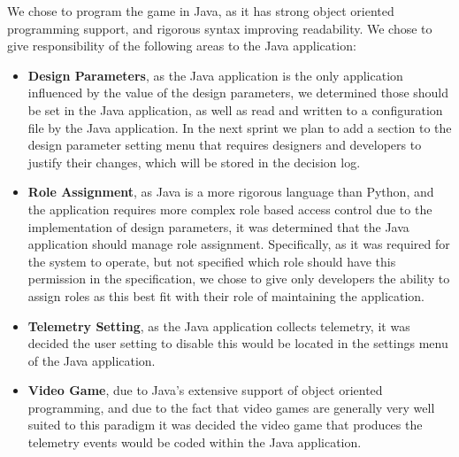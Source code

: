 We chose to program the game in Java, as it has strong object oriented programming support, and rigorous syntax improving readability. We chose to give responsibility of the following areas to the Java application:
\begin{itemize}
  \item \textbf{Design Parameters}, as the Java application is the only application influenced by the value of the design parameters, we determined those should be set in the Java application, as well as read and written to a configuration file by the Java application. In the next sprint we plan to add a section to the design parameter setting menu that requires designers and developers to justify their changes, which will be stored in the decision log.
  \item \textbf{Role Assignment}, as Java is a more rigorous language than Python, and the application requires more complex role based access control due to the implementation of design parameters, it was determined that the Java application should manage role assignment. Specifically, as it was required for the system to operate, but not specified which role should have this permission in the specification, we chose to give only developers the ability to assign roles as this best fit with their role of maintaining the application.
  \item \textbf{Telemetry Setting}, as the Java application collects telemetry, it was decided the user setting to disable this would be located in the settings menu of the Java application.
  \item \textbf{Video Game}, due to Java's extensive support of object oriented programming, and due to the fact that video games are generally very well suited to this paradigm it was decided the video game that produces the telemetry events would be coded within the Java application.
\end{itemize}

